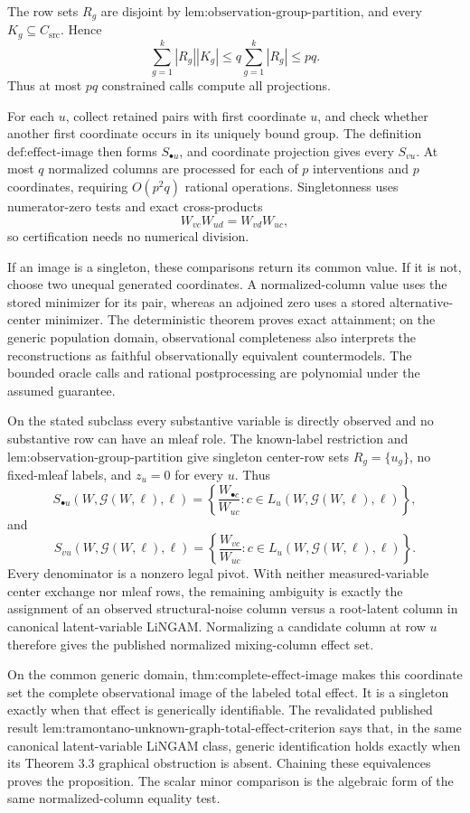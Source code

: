 The row sets \(R_g\) are disjoint by \(\text{lem:observation-group-partition}\), and every \(K_g\subseteq C_{\mathrm{src}}\). Hence
\[
\sum_{g=1}^{k}|R_g||K_g|\le q\sum_{g=1}^{k}|R_g|\le pq.
\]
Thus at most \(pq\) constrained calls compute all projections.

For each \(u\), collect retained pairs with first coordinate \(u\), and check whether another first coordinate occurs in its uniquely bound group. The definition \(\text{def:effect-image}\) then forms \(S_{\bullet u}\), and coordinate projection gives every \(S_{vu}\). At most \(q\) normalized columns are processed for each of \(p\) interventions and \(p\) coordinates, requiring \(O(p^2q)\) rational operations. Singletonness uses numerator-zero tests and exact cross-products
\[
W_{vc}W_{ud}=W_{vd}W_{uc},
\]
so certification needs no numerical division.

If an image is a singleton, these comparisons return its common value. If it is not, choose two unequal generated coordinates. A normalized-column value uses the stored minimizer for its pair, whereas an adjoined zero uses a stored alternative-center minimizer. The deterministic theorem proves exact attainment; on the generic population domain, observational completeness also interprets the reconstructions as faithful observationally equivalent countermodels. The bounded oracle calls and rational postprocessing are polynomial under the assumed guarantee.

On the stated subclass every substantive variable is directly observed and no substantive row can have an mleaf role. The known-label restriction and \(\text{lem:observation-group-partition}\) give singleton center-row sets \(R_g=\{u_g\}\), no fixed-mleaf labels, and \(z_u=0\) for every \(u\). Thus
\[
S_{\bullet u}(W,\mathcal G(W,\ell),\ell)
=\left\{\frac{W_{\bullet c}}{W_{uc}}:c\in L_u(W,\mathcal G(W,\ell),\ell)\right\},
\]
and
\[
S_{vu}(W,\mathcal G(W,\ell),\ell)
=\left\{\frac{W_{vc}}{W_{uc}}:c\in L_u(W,\mathcal G(W,\ell),\ell)\right\}.
\]
Every denominator is a nonzero legal pivot. With neither measured-variable center exchange nor mleaf rows, the remaining ambiguity is exactly the assignment of an observed structural-noise column versus a root-latent column in canonical latent-variable LiNGAM. Normalizing a candidate column at row \(u\) therefore gives the published normalized mixing-column effect set.

On the common generic domain, \(\text{thm:complete-effect-image}\) makes this coordinate set the complete observational image of the labeled total effect. It is a singleton exactly when that effect is generically identifiable. The revalidated published result \(\text{lem:tramontano-unknown-graph-total-effect-criterion}\) says that, in the same canonical latent-variable LiNGAM class, generic identification holds exactly when its Theorem 3.3 graphical obstruction is absent. Chaining these equivalences proves the proposition. The scalar minor comparison is the algebraic form of the same normalized-column equality test.

